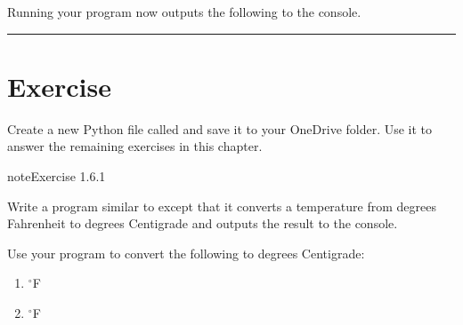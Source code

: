 \documentclass[letterpaper,10pt,english]{jupyterBook}
\begin{document}
\begin{sphinxVerbatim}[commandchars=\\\{\}]
\end{sphinxVerbatim}

\sphinxAtStartPar
Running your program now outputs the following to the console.

\begin{sphinxVerbatim}[commandchars=\\\{\}]
\end{sphinxVerbatim}


\bigskip\hrule\bigskip



\part{Exercise}
\label{\detokenize{_pages/1.5_Python_programs:exercise}}
\sphinxAtStartPar
Create a new Python file called  and save it to your OneDrive folder. Use it to answer the remaining exercises in this chapter.
 \label{exercise:python-basic-programs-ex}

\begin{sphinxadmonition}{note}{Exercise 1.6.1}



\sphinxAtStartPar
Write a program similar to  except that it converts a temperature from degrees Fahrenheit to degrees Centigrade and outputs the result to the console.

\sphinxAtStartPar
Use your program to convert the following to degrees Centigrade:
\begin{enumerate}
%
\item {} 
 \(^\circ\)F

\item {} 
 \(^\circ\)F

\end{enumerate}
\end{sphinxadmonition}







\renewcommand{\indexname}{Index}
\printindex
\end{document}
